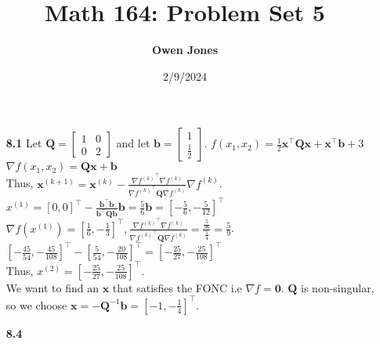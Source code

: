 \documentclass[10pt]{article}
\title{\bf Math 164: Problem Set 5}
\date{2/9/2024}
\author{\bf Owen Jones}
\begin{document}
\maketitle
\begin{enumerate}
    \item [\textbf{8.1}] Let $\mathbf{Q}=\begin{bmatrix}
        1 & 0\\
        0 & 2
    \end{bmatrix}$ and let $\mathbf{b}=\begin{bmatrix}
        1\\
        \frac{1}{2}
    \end{bmatrix}$. 
    $f(x_1,x_2)=\frac{1}{2}\mathbf{x}^\top \mathbf{Q}\mathbf{x}+\mathbf{x}^\top\mathbf{b}+3$\\
    $\nabla f(x_1,x_2)=\mathbf{Q}\mathbf{x}+\mathbf{b}$\\
    Thus, $\mathbf{x}^{(k+1)}=\mathbf{x}^{(k)}-\frac{{\nabla f^{(k)}}^\top{\nabla f^{(k)}}}{{\nabla f^{(k)}}^\top\mathbf{Q}{\nabla f^{(k)}}}\nabla f^{(k)}$.\\
    $x^{(1)}={[0,0]}^\top-\frac{\mathbf{b}^\top\mathbf{b}}{\mathbf{b}^\top\mathbf{Q}\mathbf{b}}\mathbf{b}=\frac{5}{6}\mathbf{b}={[-\frac{5}{6},-\frac{5}{12}]}^\top$\\
    $\nabla f(x^{(1)})={[\frac{1}{6},-\frac{1}{3}]}^\top,\frac{{\nabla f^{(k)}}^\top{\nabla f^{(k)}}}{{\nabla f^{(k)}}^\top\mathbf{Q}{\nabla f^{(k)}}}=\frac{\frac{5}{36}}{\frac{1}{4}}=\frac{5}{9}$.\\
    ${[-\frac{45}{54},-\frac{45}{108}]}^\top-{[\frac{5}{54},-\frac{20}{108}]}^\top={[-\frac{25}{27},-\frac{25}{108}]}^\top$\\
    Thus, $x^{(2)}={[-\frac{25}{27},-\frac{25}{108}]}^\top$.\\
    We want to find an $\mathbf{x}$ that satisfies the FONC i.e $\nabla f=\mathbf{0}$. $\mathbf{Q}$ is non-singular, so we choose $\mathbf{x}=-\mathbf{Q}^{-1}\mathbf{b}={[-1,-\frac{1}{4}]}^\top$.
    \item [\textbf{8.4}] 
\end{enumerate}
\end{document}
